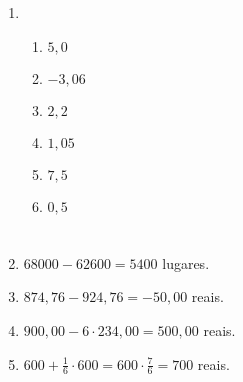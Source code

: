 \documentclass[a4paper]{article}
\begin{document}
\begin{enumerate}
\item 
  \begin{enumerate}
  \item $5,0$
  \item $-3,06$
  \item $2,2$
  \item $1,05$
  \item $7,5$
  \item $0,5$
  \end{enumerate}

\section{}

\item $68000 - 62600 = 5400$ lugares.

\item $874,76 - 924,76 = -50,00$ reais.

\item $900,00 - 6\cdot 234,00 = 500,00$ reais.

\item $600 + \frac{1}{6}\cdot 600 = 600\cdot\frac{7}{6} = 700$ reais.
\end{enumerate}
\end{document}
